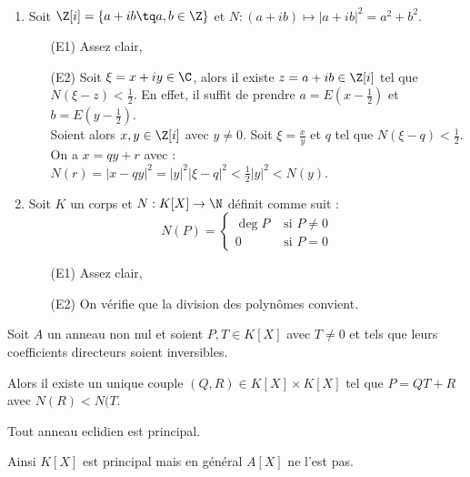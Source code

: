 \begin{example}[Exemples]\
 \begin{enumerate}
  \item Soit $\Z[i] = \{a +ib \tq a,b\in\Z\}$ et $N : (a+ib) \mapsto
|a+ib|^2=a^2+b^2$.
\begin{itemize}
 \item [(E1)] Assez clair,
 \item [(E2)] Soit $\xi = x+iy \in \C$, alors il existe $z = a+ib\in \Z[i]$ tel
que $N(\xi-z) < \frac{1}{2}$. En effet, il suffit de prendre
$a=E(x-\frac{1}{2})$ et $b=E(y-\frac{1}{2})$.\\
Soient alors $x,y\in\Z[i]$ avec $y\neq 0$. Soit $\xi = \frac{x}{y}$ et $q$ tel
que $N(\xi-q) < \frac{1}{2}$. On a $x = qy +r$ avec :\\
$N(r) = |x-qy|^2=|y|^2|\xi-q|^2 < \frac{1}{2}|y|^2 < N(y)$.
\end{itemize}
\item Soit $K$ un corps et $N : K[X] \rightarrow \N$ définit comme suit :
\begin{displaymath}
 N(P) = \left\lbrace\begin{array}{ll}
\deg P & \text{ si } P \neq 0\\
0      &\text{ si } P = 0   \end{array}\right.
\end{displaymath}
\begin{itemize}
 \item [(E1)] Assez clair,
 \item [(E2)] On vérifie que la division des polynômes convient.
\end{itemize}
\end{enumerate}
\end{example}

\begin{prop}
 
Soit $A$ un anneau non nul et soient $P,T \in K[X]$ avec $T\neq 0$ et tels que
leurs coefficients directeurs soient inversibles.

Alors il existe un unique couple $(Q,R)\in K[X]\times K[X]$ tel que $P = QT+R$
avec $N(R) < N(T$.
\end{prop}

\begin{theo}
 
Tout anneau eclidien est principal.
\end{theo}

\begin{example}[Remarque] Ainsi $K[X]$ est principal mais en général $A[X]$ ne
l'est pas.
\end{example}

